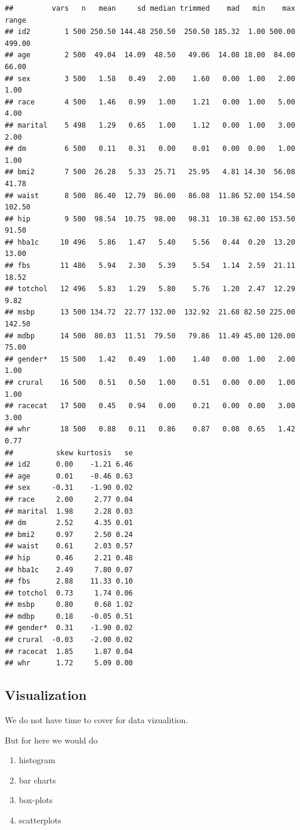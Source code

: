 \documentclass[]{book}
\providecommand{\tightlist}{%
  \setlength{\itemsep}{0pt}\setlength{\parskip}{0pt}}
\theoremstyle{definition}
\theoremstyle{definition}
\theoremstyle{remark}
\begin{document}
\begin{verbatim}
##         vars   n   mean     sd median trimmed    mad   min    max  range
## id2        1 500 250.50 144.48 250.50  250.50 185.32  1.00 500.00 499.00
## age        2 500  49.04  14.09  48.50   49.06  14.08 18.00  84.00  66.00
## sex        3 500   1.58   0.49   2.00    1.60   0.00  1.00   2.00   1.00
## race       4 500   1.46   0.99   1.00    1.21   0.00  1.00   5.00   4.00
## marital    5 498   1.29   0.65   1.00    1.12   0.00  1.00   3.00   2.00
## dm         6 500   0.11   0.31   0.00    0.01   0.00  0.00   1.00   1.00
## bmi2       7 500  26.28   5.33  25.71   25.95   4.81 14.30  56.08  41.78
## waist      8 500  86.40  12.79  86.00   86.08  11.86 52.00 154.50 102.50
## hip        9 500  98.54  10.75  98.00   98.31  10.38 62.00 153.50  91.50
## hba1c     10 496   5.86   1.47   5.40    5.56   0.44  0.20  13.20  13.00
## fbs       11 486   5.94   2.30   5.39    5.54   1.14  2.59  21.11  18.52
## totchol   12 496   5.83   1.29   5.80    5.76   1.20  2.47  12.29   9.82
## msbp      13 500 134.72  22.77 132.00  132.92  21.68 82.50 225.00 142.50
## mdbp      14 500  80.03  11.51  79.50   79.86  11.49 45.00 120.00  75.00
## gender*   15 500   1.42   0.49   1.00    1.40   0.00  1.00   2.00   1.00
## crural    16 500   0.51   0.50   1.00    0.51   0.00  0.00   1.00   1.00
## racecat   17 500   0.45   0.94   0.00    0.21   0.00  0.00   3.00   3.00
## whr       18 500   0.88   0.11   0.86    0.87   0.08  0.65   1.42   0.77
##          skew kurtosis   se
## id2      0.00    -1.21 6.46
## age      0.01    -0.46 0.63
## sex     -0.31    -1.90 0.02
## race     2.00     2.77 0.04
## marital  1.98     2.28 0.03
## dm       2.52     4.35 0.01
## bmi2     0.97     2.50 0.24
## waist    0.61     2.03 0.57
## hip      0.46     2.21 0.48
## hba1c    2.49     7.80 0.07
## fbs      2.88    11.33 0.10
## totchol  0.73     1.74 0.06
## msbp     0.80     0.68 1.02
## mdbp     0.18    -0.05 0.51
## gender*  0.31    -1.90 0.02
## crural  -0.03    -2.00 0.02
## racecat  1.85     1.87 0.04
## whr      1.72     5.09 0.00
\end{verbatim}

\subsection{Visualization}\label{visualization}

We do not have time to cover for data vizualition.

But for here we would do

\begin{enumerate}
\def\labelenumi{\arabic{enumi}.}
\tightlist
\item
  histogram
\item
  bar charts
\item
  box-plots
\item
  scatterplots
\end{enumerate}
\end{document}
